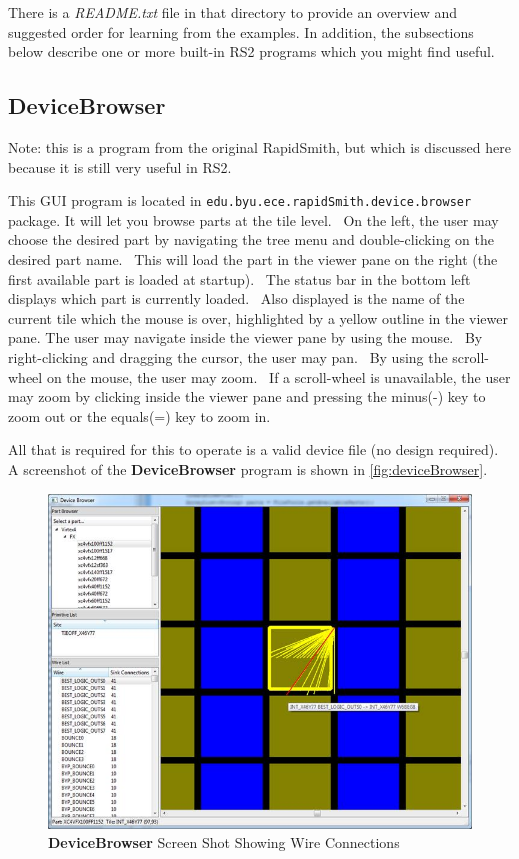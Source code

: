 \documentclass[12pt]{article}
\newcommand{\fil}[1]{{\em #1}}
\newcommand{\pkg}[1]{{\texttt{#1}}}
\newcommand{\pgm}[1]{{\textbf{#1}}}
\begin{document}
There is a \fil{README.txt} file in that directory to provide an overview and
suggested order for learning from the examples.
In addition, the subsections below describe one or more built-in RS2 programs
which you might find useful.

\subsection{\pgm{DeviceBrowser}}
Note: this is a program from the original RapidSmith, but which is discussed
here because it is still very useful in RS2. 

This GUI program is located in \pkg{edu.byu.ece.rapidSmith.device.browser}
package.  It will let you browse parts at the tile level.  On the left, the user
may choose the desired part by navigating the tree menu and double-clicking on
the desired part name.  This will load the part in the viewer pane on the right
(the first available part is loaded at startup).  The status bar in the bottom
left displays which part is currently loaded.  Also displayed is the name of the
current tile which the mouse is over, highlighted by a yellow outline in the
viewer pane. The user may navigate inside the viewer pane by using the mouse.
 By right-clicking and dragging the cursor, the user may pan.  By using the
scroll-wheel on the mouse, the user may zoom.  If a scroll-wheel is unavailable,
the user may zoom by clicking inside the viewer pane and pressing the minus(-)
key to zoom out or the equals(=) key to zoom in.

All that is required for this to operate is a valid device file (no design
required). A screenshot of the \pgm{DeviceBrowser} program is shown in
\autoref{fig:deviceBrowser}.

\begin{figure}[htb]
\centering
\includegraphics[width=0.8\columnwidth]{deviceBrowser2}
\caption{\pgm{DeviceBrowser} Screen Shot Showing Wire Connections}
\label{fig:deviceBrowser2}
\end{figure}
\end{document}
